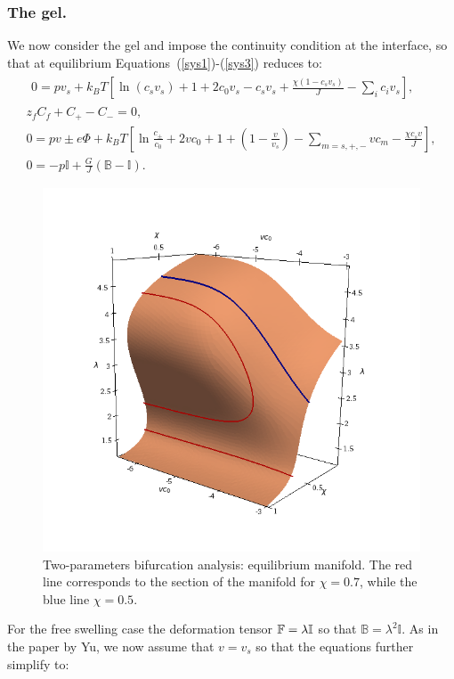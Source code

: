 \subsubsection{The gel.}
We now consider the gel and impose the continuity condition at the interface, so that at equilibrium Equations~(\ref{sys1})-(\ref{sys3}) reduces to:
\begin{gather}
\begin{aligned}
0 = p v_s + k_BT\left[\ln (c_s v_s) +1 +2c_0v_s-c_sv_s+
\frac{\chi(1-c_sv_s)}{J}-\sum_i c_iv_s\right], 
\end{aligned}\\[2.5mm]
z_fC_f+C_+-C_-=0,\\
0 = p v \pm e\Phi + k_BT \left[\ln \frac{c_\pm}{c_0}+2vc_0+1+\left(1-\frac{v}{v_s}\right)-\sum_{m=s,+,-}vc_m -\frac{\chi c_sv}{J} \right],\\
0= -p \mathbb{I} + \frac{G}{J}\left(\mathbb{B}-\mathbb{I}\right).
\end{gather}
\begin{figure}[h]
	\includegraphics[scale=0.5]{images/manifold_new}
	\caption{Two-parameters bifurcation analysis: equilibrium manifold. The red line corresponds to the section of the manifold for $\chi=0.7$, while the blue line $\chi=0.5$.}
	\label{manifold}
\end{figure}
For the free swelling case the deformation tensor $\mathbb{F}=\lambda\mathbb{I}$ so that $\mathbb{B}=\lambda^2\mathbb{I}$. As in the paper by Yu, we now assume that $v=v_s$ so that the equations further simplify to:
